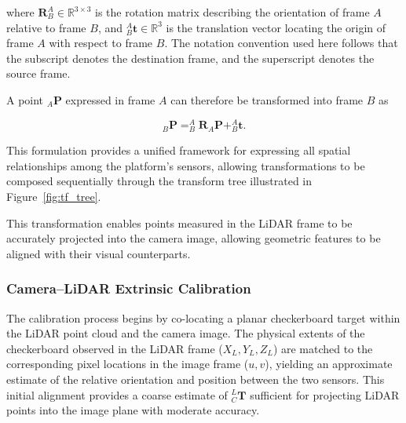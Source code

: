 \documentclass{erauthesis}
\begin{document}
where $\mathbf{R}_{B}^{A} \in \mathbb{R}^{3\times3}$ is the rotation matrix describing the orientation of frame $A$ relative to frame $B$, and $_{B}^{A}\mathbf{t} \in \mathbb{R}^{3}$ is the translation vector locating the origin of frame $A$ with respect to frame $B$.  
The notation convention used here follows that the subscript denotes the destination frame, and the superscript denotes the source frame.

A point $_{A}\mathbf{P}$ expressed in frame $A$ can therefore be transformed into frame $B$ as

\begin{equation}
    _{B}\mathbf{P} =
    _{B}^{A}\mathbf{R} _{A}\mathbf{P} + _{B}^{A}\mathbf{t}.
\end{equation}

This formulation provides a unified framework for expressing all spatial relationships among the platform’s sensors, allowing transformations to be composed sequentially through the transform tree illustrated in Figure~\ref{fig:tf_tree}.


This transformation enables points measured in the LiDAR frame to be accurately projected into the camera image, allowing geometric features to be aligned with their visual counterparts.

\subsubsection{Camera–LiDAR Extrinsic Calibration} \label{camLidar_calib}

The calibration process begins by co-locating a planar checkerboard target within the LiDAR point cloud and the camera image.  
The physical extents of the checkerboard observed in the LiDAR frame ($X_L, Y_L, Z_L$) are matched to the corresponding pixel locations in the image frame ($u,v$), yielding an approximate estimate of the relative orientation and position between the two sensors.  
This initial alignment provides a coarse estimate of $_{C}^{L}\mathbf{T}$ sufficient for projecting LiDAR points into the image plane with moderate accuracy.
\end{document}
